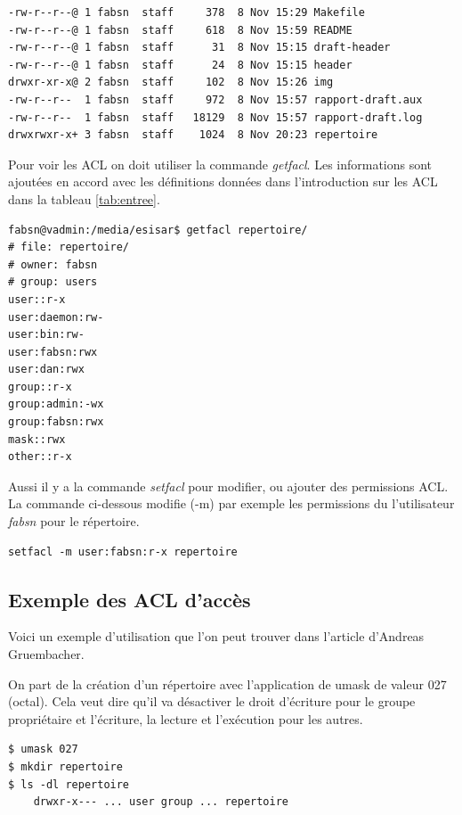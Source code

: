 \documentclass{article}
\begin{document}
\begin{center}
\label{verb:ls}
\begin{verbatim}
-rw-r--r--@ 1 fabsn  staff     378  8 Nov 15:29 Makefile
-rw-r--r--@ 1 fabsn  staff     618  8 Nov 15:59 README
-rw-r--r--@ 1 fabsn  staff      31  8 Nov 15:15 draft-header
-rw-r--r--@ 1 fabsn  staff      24  8 Nov 15:15 header
drwxr-xr-x@ 2 fabsn  staff     102  8 Nov 15:26 img
-rw-r--r--  1 fabsn  staff     972  8 Nov 15:57 rapport-draft.aux
-rw-r--r--  1 fabsn  staff   18129  8 Nov 15:57 rapport-draft.log
drwxrwxr-x+ 3 fabsn  staff	  1024  8 Nov 20:23 repertoire
\end{verbatim}
\end{center}

Pour voir les ACL on doit utiliser la commande \emph{getfacl}. Les informations sont ajoutées en accord avec les définitions données dans l'introduction sur les ACL dans la tableau \ref{tab:entree}. 

\begin{verbatim}
fabsn@vadmin:/media/esisar$ getfacl repertoire/
# file: repertoire/
# owner: fabsn
# group: users 
user::r-x
user:daemon:rw-
user:bin:rw-
user:fabsn:rwx
user:dan:rwx
group::r-x
group:admin:-wx
group:fabsn:rwx
mask::rwx
other::r-x	
\end{verbatim}

Aussi il y a la commande \emph{setfacl} pour modifier, ou ajouter des permissions ACL. La commande ci-dessous modifie (-m) par exemple les permissions du l'utilisateur \emph{fabsn} pour le répertoire. 

\begin{verbatim}
setfacl -m user:fabsn:r-x repertoire
\end{verbatim}


\subsection{Exemple des ACL d'accès}

Voici un exemple d'utilisation que l'on peut trouver dans l'article d'Andreas Gruembacher\cite{aclsuse}.

On part de la création d'un répertoire avec l'application de umask de valeur 027 (octal). Cela veut dire qu'il va désactiver le droit d'écriture pour le groupe propriétaire et l'écriture, la lecture et l'exécution pour les autres.

\begin{verbatim}
$ umask 027 
$ mkdir repertoire
$ ls -dl repertoire
	drwxr-x--- ... user group ... repertoire
\end{verbatim}
\end{document}

